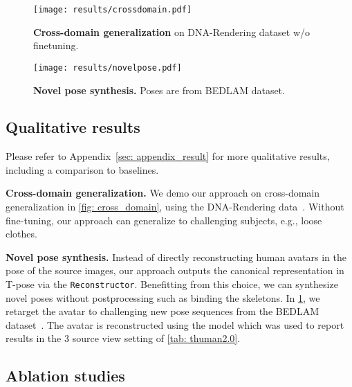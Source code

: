 \begin{figure}[t]
\vspace{-2mm}
    \centering
    \begin{minipage}{.45\textwidth}
        \texttt{[image: results/crossdomain.pdf]}
    \vspace{-8mm}
        \caption{\textbf{Cross-domain generalization} on DNA-Rendering dataset w/o finetuning.
        }
        \label{fig: cross_domain}
    \end{minipage}\hspace{.5cm}
    \begin{minipage}{.45\textwidth}
        \texttt{[image: results/novelpose.pdf]}
        \vspace{-8mm}
    \caption{\textbf{Novel pose synthesis.} Poses are from BEDLAM dataset.}
    \label{fig: quant_novel_pose}
    \end{minipage}
\vspace{-6.5mm}
\end{figure}
\subsection{Qualitative results}


Please refer to Appendix~\ref{sec: appendix_result} for more qualitative results, including a comparison to baselines.

\textbf{Cross-domain generalization.} We demo our approach on cross-domain generalization in \cref{fig: cross_domain}, using the DNA-Rendering data~\citep{cheng2023dna}. Without fine-tuning, our approach can generalize to challenging subjects, e.g., loose clothes.

\textbf{Novel pose synthesis.} Instead of directly reconstructing human avatars in the pose of the source images, our approach outputs the canonical representation in T-pose via the  \texttt{Reconstructor}. %
Benefitting from this choice, we can synthesize novel poses without postprocessing such as binding the skeletons. In \cref{fig: quant_novel_pose}, we retarget the avatar to challenging new pose sequences from the BEDLAM dataset~\citep{Black_CVPR_2023}. The avatar is reconstructed using the model which was used to report results in the 3 source view setting of \cref{tab: thuman2.0}.\vspace{-0.2cm}

\subsection{Ablation studies}

